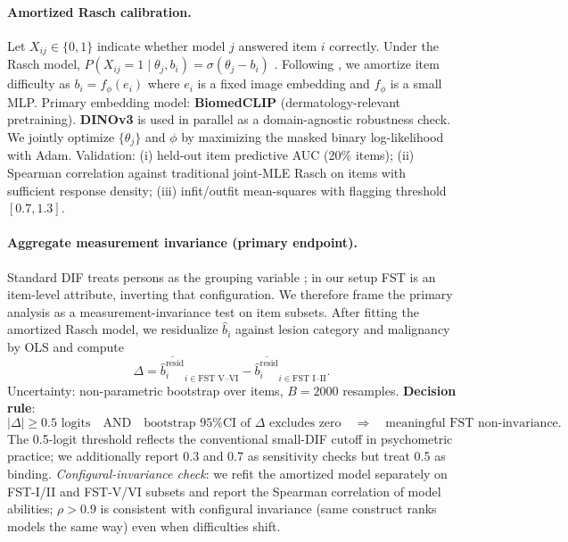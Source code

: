\documentclass{article}
\begin{document}
\paragraph{Amortized Rasch calibration.}
\label{sec:amortized}
Let $X_{ij} \in \{0, 1\}$ indicate whether model $j$ answered item $i$ correctly. Under the Rasch model, $P(X_{ij} = 1 \mid \theta_j, b_i) = \sigma(\theta_j - b_i)$ \citep[Ch.~2]{truong2026aims}. Following \citet{truong2025reliableefficientamortizedmodelbased}, we amortize item difficulty as $b_i = f_\phi(e_i)$ where $e_i$ is a fixed image embedding and $f_\phi$ is a small MLP. Primary embedding model: \textbf{BiomedCLIP} \citep{zhang2023biomedclip} (dermatology-relevant pretraining). \textbf{DINOv3} \citep{siméoni2025dinov3} is used in parallel as a domain-agnostic robustness check. We jointly optimize $\{\theta_j\}$ and $\phi$ by maximizing the masked binary log-likelihood with Adam. Validation: (i) held-out item predictive AUC (20\% items); (ii) Spearman correlation against traditional joint-MLE Rasch on items with sufficient response density; (iii) infit/outfit mean-squares with flagging threshold $[0.7, 1.3]$.

\paragraph{Aggregate measurement invariance (primary endpoint).}
\label{sec:aggregate}
Standard DIF treats persons as the grouping variable \citep[Ch.~6]{truong2026aims}; in our setup FST is an item-level attribute, inverting that configuration. We therefore frame the primary analysis as a measurement-invariance test on item subsets. After fitting the amortized Rasch model, we residualize $\hat b_i$ against lesion category and malignancy by OLS and compute
\begin{equation}
\Delta = \overline{\hat b_i^{\text{resid}}}_{i \in \text{FST V--VI}} - \overline{\hat b_i^{\text{resid}}}_{i \in \text{FST I--II}}.
\end{equation}
Uncertainty: non-parametric bootstrap over items, $B = 2000$ resamples. \textbf{Decision rule}:
\begin{equation}
|\Delta| \geq 0.5 \text{ logits} \quad \text{AND} \quad \text{bootstrap 95\% CI of } \Delta \text{ excludes zero} \quad \Rightarrow \quad \text{meaningful FST non-invariance}.
\end{equation}
The 0.5-logit threshold reflects the conventional small-DIF cutoff in psychometric practice; we additionally report 0.3 and 0.7 as sensitivity checks but treat 0.5 as binding. \textit{Configural-invariance check}: we refit the amortized model separately on FST-I/II and FST-V/VI subsets and report the Spearman correlation of model abilities; $\rho > 0.9$ is consistent with configural invariance (same construct ranks models the same way) even when difficulties shift.
\end{document}
